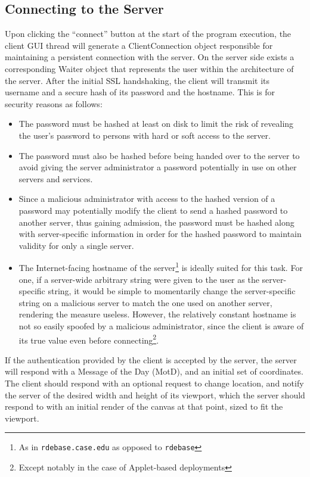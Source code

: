 \documentclass[11pt,oneside,a4paper]{article}
\begin{document}
 \subsection{Connecting to the Server}
  Upon clicking the ``connect'' button at the start of the program execution,
  the client GUI thread will generate a ClientConnection object responsible for
  maintaining a persistent connection with the server. On the server side exists
  a corresponding Waiter object that represents the user within the architecture
  of the server. After the initial SSL handshaking, the client will transmit its
  username and a secure hash of its password and the hostname. This is for
  security reasons as follows:
  \begin{itemize}
   \item
    The password must be hashed at least on disk to limit the risk of revealing
    the user's password to persons with hard or soft access to the server.
   \item
    The password must also be hashed before being handed over to the server to
    avoid giving the server administrator a password potentially in use on other
    servers and services.
   \item
    Since a malicious administrator with access to the hashed version of a
    password may potentially modify the client to send a hashed password to another
    server, thus gaining admission, the password must be hashed along with
    server-specific information in order for the hashed password to maintain
    validity for only a single server.
   \item
    The Internet-facing hostname of the server\footnote{As in
    \texttt{rdebase.case.edu} as opposed to \texttt{rdebase}} is ideally suited for
    this task. For one, if a server-wide arbitrary string were given to the user as
    the server-specific string, it would be simple to momentarily change the
    server-specific string on a malicious server to match the one used on another
    server, rendering the measure useless. However, the relatively constant
    hostname is not so easily spoofed by a malicious administrator, since the
    client is aware of its true value even before connecting\footnote{Except
    notably in the case of Applet-based deployments}.
  \end{itemize}
  If the authentication provided by the client is accepted by the server, the
  server will respond with a Message of the Day (MotD), and an initial set of
  coordinates. The client should respond with an optional request to change
  location, and notify the server of the desired width and height of its
  viewport, which the server should respond to with an initial render of the
  canvas at that point, sized to fit the viewport.
\end{document}
